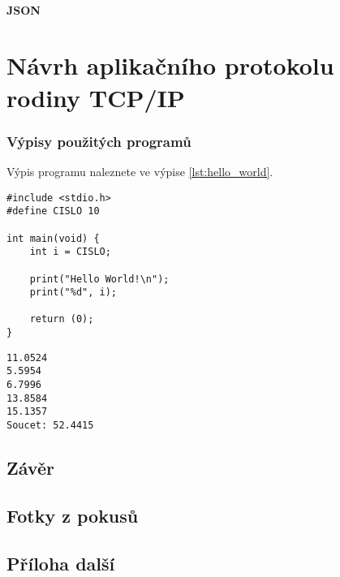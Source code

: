 \documentclass[12pt]{report}			%
\begin{document}
\url{}
\url{}
\url{}
\url{}

				\subsection{JSON}

\url{}
\url{}
\url{}
\url{}



				\subsection{}
			

	\part{Návrh aplikačního protokolu rodiny TCP/IP}

\section{Výpisy použitých programů}

\lipsum[1]	

Výpis programu   naleznete ve výpise \ref{lst:hello_world}.

\begin{lstlisting}[title={Program hello.c}, caption={hello.c}, label={lst:hello_world}]
#include <stdio.h>
#define CISLO 10

int main(void) {
	int i = CISLO;

	print("Hello World!\n");
	print("%d", i);

	return (0);
}
\end{lstlisting}

\lipsum[1]	

\begin{lstlisting}[numbers=none, title={Příklad výstupního souboru}]
11.0524
5.5954
6.7996
13.8584
15.1357
Soucet: 52.4415
\end{lstlisting}

	\chapter*{Závěr}
	
		\lipsum[1]
	
	\nocite{*}
    	\printbibliography					
    \printglossary[title={Zkratky}]		
    \listoffigures					
    \listoftables						

    \begin{appendices}
	\chapter{Fotky z pokusů}	
	\lipsum[1]
	\chapter{Příloha další }
	\end{appendices}
\end{document}
